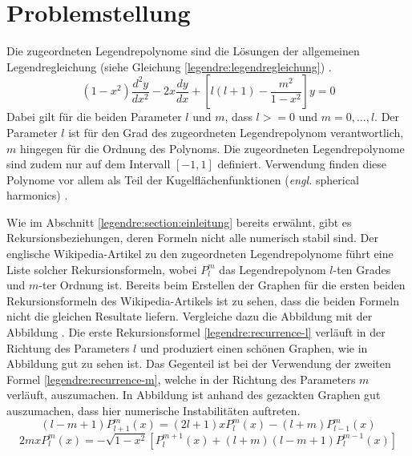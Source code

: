 %
%
%
\section{Problemstellung
\label{legendre:section:problemstellung}}
Die zugeordneten Legendrepolynome sind die Lösungen der allgemeinen Legendregleichung (siehe Gleichung \eqref{legendre:legendregleichung}) \cite{legendre:assoc-legendre-poly-wolfram} \cite{legendre:assoc-legendre-diff-wolfram}.
\begin{equation}
(1-x^2) \frac{d^2y}{dx^2}
-2x \frac{dy}{dx}
+ \left[ l(l+1)- \frac{m^2}{1-x^2} \right] y
=0
\label{legendre:legendregleichung}
\end{equation}
Dabei gilt für die beiden Parameter $l$ und $m$, dass $l>=0$ und $m=0, \ldots , l$.
Der Parameter $l$ ist für den Grad des zugeordneten Legendrepolynom verantwortlich, $m$ hingegen für die Ordnung des Polynoms.
Die zugeordneten Legendrepolynome sind zudem nur auf dem Intervall $[-1, 1]$ definiert.
Verwendung finden diese Polynome vor allem als Teil der Kugelflächenfunktionen (\textit{engl.} spherical harmonics) \cite{legendre:spherical-harmonic-wolfram}.

Wie im Abschnitt \ref{legendre:section:einleitung} bereits erwähnt, gibt es Rekursionsbeziehungen, deren Formeln nicht alle numerisch stabil sind.
Der englische Wikipedia-Artikel \cite{legendre:wikipedia} zu den zugeordneten Legendrepolynome führt eine Liste solcher Rekursionsformeln, wobei $P^{m}_{l}$ das Legendrepolynom $l$-ten Grades und $m$-ter Ordnung ist.
Bereits beim Erstellen der Graphen für die ersten beiden Rekursionsformeln des Wikipedia-Artikels ist zu sehen, dass die beiden Formeln nicht die gleichen Resultate liefern.
Vergleiche dazu die Abbildung  mit der Abbildung .
Die erste Rekursionsformel \eqref{legendre:recurrence-l} verläuft in der Richtung des Parameters $l$ und produziert einen schönen Graphen, wie in Abbildung  gut zu sehen ist.
Das Gegenteil ist bei der Verwendung der zweiten Formel \eqref{legendre:recurrence-m}, welche in der Richtung des Parameters $m$ verläuft, auszumachen.
In Abbildung  ist anhand des gezackten Graphen gut auszumachen, dass hier numerische Instabilitäten auftreten.
\begin{equation}
(l-m+1)P^{m}_{l+1}(x)
=(2l+1)xP^{m}_{l}(x)
-(l+m)P^{m}_{l-1}(x)
\label{legendre:recurrence-l}
\end{equation}
\begin{equation}
2mxP^{m}_{l}(x)
=-\sqrt{1-x^2}
\left[ P^{m+1}_{l}(x) + (l+m)(l-m+1)P^{m-1}_{l}(x) \right]
\label{legendre:recurrence-m}
\end{equation}

